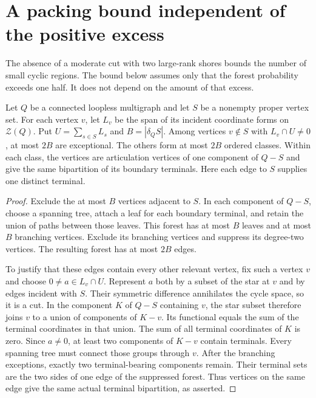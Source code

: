 \section{A packing bound independent of the positive excess}
\label{sec:four-high-connectivity-excess-free-packing}

The absence of a moderate cut with two large-rank shores bounds the number of small cyclic regions.
The bound below assumes only that the forest probability exceeds one half.
It does not depend on the amount of that excess.

\begin{lemma}
\label{lem:four-terminal-bipartition}
Let $Q$ be a connected loopless multigraph and let $S$ be a nonempty proper vertex set.
For each vertex $v$, let $L_v$ be the span of its incident coordinate forms on $\mathcal Z(Q)$.
Put $U=\sum_{s\in S}L_s$ and $B=|\delta_QS|$.
Among vertices $v\notin S$ with $L_v\cap U\ne0$, at most $2B$ are exceptional.
The others form at most $2B$ ordered classes.
Within each class, the vertices are articulation vertices of one component of $Q-S$ and give the same bipartition of its boundary terminals.
Here each edge to $S$ supplies one distinct terminal.
\end{lemma}

\begin{proof}
Exclude the at most $B$ vertices adjacent to $S$.
In each component of $Q-S$, choose a spanning tree, attach a leaf for each boundary terminal, and retain the union of paths between those leaves.
This forest has at most $B$ leaves and at most $B$ branching vertices.
Exclude its branching vertices and suppress its degree-two vertices.
The resulting forest has at most $2B$ edges.

To justify that these edges contain every other relevant vertex, fix such a vertex $v$ and choose $0\ne a\in L_v\cap U$.
Represent $a$ both by a subset of the star at $v$ and by edges incident with $S$.
Their symmetric difference annihilates the cycle space, so it is a cut.
In the component $K$ of $Q-S$ containing $v$, the star subset therefore joins $v$ to a union of components of $K-v$.
Its functional equals the sum of the terminal coordinates in that union.
The sum of all terminal coordinates of $K$ is zero.
Since $a\ne0$, at least two components of $K-v$ contain terminals.
Every spanning tree must connect those groups through $v$.
After the branching exceptions, exactly two terminal-bearing components remain.
Their terminal sets are the two sides of one edge of the suppressed forest.
Thus vertices on the same edge give the same actual terminal bipartition, as asserted.
\end{proof}

